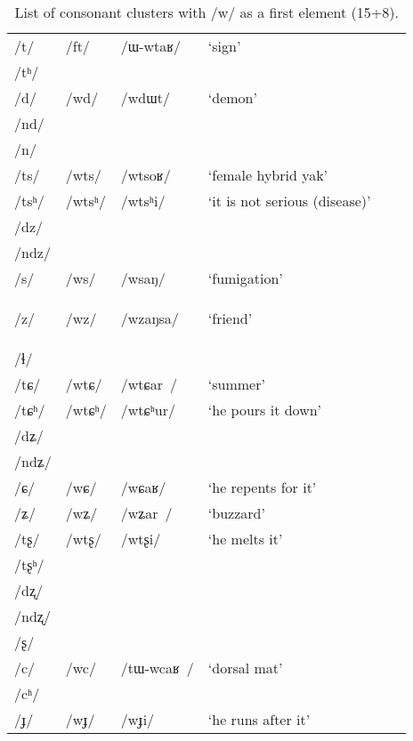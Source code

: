 \documentclass[12pt]{article}
\newcommand{\ipa}[1]{\mbox{\phon/#1/}}
\newcommand{\deux}[1]{\ipa{#1}\addtocounter{2clusters}{1}}
\newcommand{\tib}[1]{\cellcolor{lightgray}\textbf{#1}}
\begin{document}
 
\setlength{\LTleft}{0pt}

 \begin{table}
 \caption{List of consonant clusters with \ipa{w} as a first element (15+8).}  \label{prein.w}
\begin{tabular}{llllll}
\toprule
\ipa{t}  & 	 \deux{ft}  & 	 \ipa{ɯ-wtaʁ}  & 	 `sign'  & 	\\
\ipa{tʰ}  & 	  & 	  & 	  & 	\\
\ipa{d}  & 	 \deux{wd}  & 	 \ipa{wdɯt}  & 	 `demon'  & 	\\
\ipa{nd}  & 	  & 	  & 	  & 	\\
\ipa{n}  & 	  & 	  & 	  & 	\\
\ipa{ts}  & 	 \deux{wts}  & 	 \ipa{wtsoʁ}  & 	 `female hybrid yak'  & 	\\
\ipa{tsʰ}  & 	 \deux{wtsʰ}  & 	 \ipa{wtsʰi}  & 	 `it is not serious (disease)'  & 	\\
\ipa{dz}  & 	  & 	  & 	  & 	\\
\ipa{ndz}  & 	  & 	  & 	  & 	\\
\ipa{s}  & 	 \deux{ws}  & 	 \ipa{wsaŋ}  & 	 `fumigation'  & 	\\
\ipa{z}  & 	 \deux{wz} \tib{}  & 	 \ipa{wzaŋsa}  & 	 `friend'  & 	\\
\ipa{ɬ}  & 	  & 	  & 	  & 	\\
\ipa{tɕ}  & 	 \deux{wtɕ}  & 	 \ipa{wtɕar }  & 	 `summer'  & 	\\
\ipa{tɕʰ}  & 	 \deux{wtɕʰ}  & 	 \ipa{wtɕʰur}  & 	 `he pours it down'  & 	\\
\ipa{dʑ}  & 	  & 	  & 	  & 	\\
\ipa{ndʑ}  & 	  & 	  & 	  & 	\\
\ipa{ɕ}  & 	 \deux{wɕ}  & 	 \ipa{wɕaʁ}  & 	 `he repents for it'  & 	\\
\ipa{ʑ}  & 	 \deux{wʑ}  & 	 \ipa{wʑar }  & 	 `buzzard'  & 	\\
\ipa{tʂ}  & 	 \deux{wtʂ}  & 	 \ipa{wtʂi}  & 	 `he melts it'  & 	\\
\ipa{tʂʰ}  & 	  & 	  & 	  & 	\\
\ipa{dʐ}  & 	  & 	  & 	  & 	\\
\ipa{ndʐ}  & 	  & 	  & 	  & 	\\
\ipa{ʂ}  & 	  & 	  & 	  & 	\\
\ipa{c}  & 	 \deux{wc}  & 	 \ipa{tɯ-wcaʁ }  & 	 `dorsal mat'  & 	\\
\ipa{cʰ}  & 	  & 	  & 	  & 	\\
\ipa{ɟ}  & 	 \deux{wɟ}  & 	 \ipa{wɟi}  & 	 `he runs after it'  & 	\\

\end{tabular}
\end{table}
\end{document}
